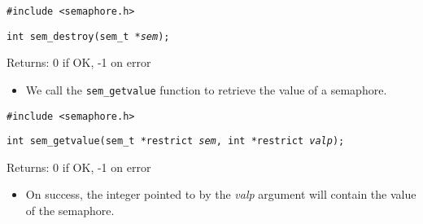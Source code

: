 \documentclass[]{article}
\newcommand{\code}{\texttt}
\begin{document}
\code{\#include <semaphore.h>}

\code{int sem\_destroy(sem\_t *\emph{sem});}

Returns: 0 if OK, -1 on error

\begin{itemize}
\item We call the \code{sem\_getvalue} function to retrieve the value of a
semaphore.
\end{itemize}

\code{\#include <semaphore.h>}

\code{int sem\_getvalue(sem\_t *restrict \emph{sem}, int *restrict
\emph{valp});}

Returns: 0 if OK, -1 on error

\begin{itemize}
\item On success, the integer pointed to by the \emph{valp} argument will
contain the value of the semaphore.
\end{itemize}
\end{document}
